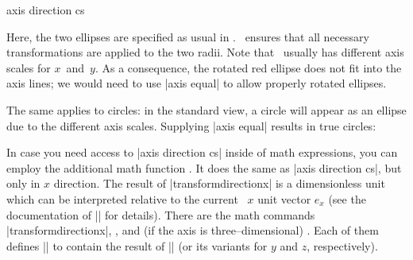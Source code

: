 \begin{coordinatesystem}{axis direction cs}
\begin{codeexample}[]
\end{codeexample}
	Here, the two ellipses are specified as usual in \tikzname. \PGFPlots\ ensures that all necessary transformations are applied to the two radii. Note that \PGFPlots\ usually has different axis scales for $x$~and~$y$. As a consequence, the rotated red ellipse does not fit into the axis lines; we would need to use |axis equal| to allow properly rotated ellipses.

	The same applies to circles: in the standard view, a circle will appear as an ellipse due to the different axis scales. Supplying |axis equal| results in true circles:
\begin{codeexample}[]
\end{codeexample}
\begin{codeexample}[]
\end{codeexample}

	In case you need access to |axis direction cs| inside of math expressions, you can employ the additional math function . It does the same as |axis direction cs|, but only in $x$ direction. The result of |transformdirectionx| is a dimensionless unit which can be interpreted relative to the current \pgfname\ $x$ unit vector $e_x$ (see the documentation of |\pgfplotstransformdirectionx| for details).
	There are the math commands |transformdirectionx|, , and (if the axis is three--dimensional) . Each of them defines |\pgfmathresult| to contain the result of |\pgfplotstransformdirectionx| (or its variants for $y$ and $z$, respectively).
	
\end{coordinatesystem}


